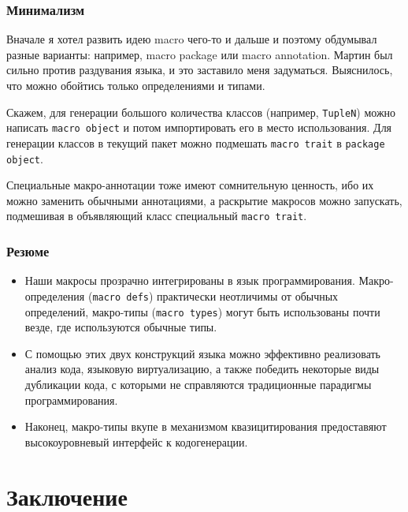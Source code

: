 \documentclass[hyperref={bookmarks=false}]{beamer}
\begin{document}
\begin{frame}[t]
\frametitle{Минимализм}

Вначале я хотел развить идею macro чего-то и дальше и поэтому обдумывал разные варианты: например, macro package или macro annotation. Мартин был сильно против раздувания языка, и это заставило меня задуматься. Выяснилось, что можно обойтись только определениями и типами.

Скажем, для генерации большого количества классов (например, \texttt{TupleN}) можно написать \texttt{macro object} и потом импортировать его в место использования. Для генерации классов в текущий пакет можно подмешать \texttt{macro trait} в \texttt{package object}.

Специальные макро-аннотации тоже имеют сомнительную ценность, ибо их можно заменить обычными аннотациями, а раскрытие макросов можно запускать, подмешивая в объявляющий класс специальный \texttt{macro trait}.
\end{frame}

\begin{frame}[t]
\frametitle{Резюме}
\begin{itemize}
\item Наши макросы прозрачно интегрированы в язык программирования. Макро-определения (\texttt{macro defs}) практически неотличимы от обычных определений, макро-типы (\texttt{macro types}) могут быть использованы почти везде, где используются обычные типы.
\item С помощью этих двух конструкций языка можно эффективно реализовать анализ кода, языковую виртуализацию, а также победить некоторые виды дубликации кода, с которыми не справляются традиционные парадигмы программирования.
\item Наконец, макро-типы вкупе в механизмом квазицитирования предоставяют высокоуровневый интерфейс к кодогенерации.
\end{itemize}
\end{frame}

\section{Заключение}
\end{document}
